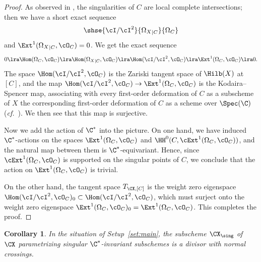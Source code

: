 \documentclass[11pt]{amsart}
\numberwithin{equation}{section}
\newtheorem{corollary}[theorem]{Corollary}
\theoremstyle{definition}
\theoremstyle{remark}
\begin{document}
\begin{proof}
As observed in \cite[Proof of Proposition 6.4]{WORS6}, the singularities of $C$ are local complete intersections; then we have a short exact sequence
\begin{equation}\label{eq:ses1}
\shse{\cI/\cI^2}{{\Omega_X}_{|C}}{\Omega_C}
\end{equation}
and  $\Ext^1({\Omega_X}_{|C},\cO_C)=0$. 
We get the exact sequence 
\begin{multline}\label{eq:FP}
0\lra\Hom(\Omega_C,\cO_C)\lra\Hom({\Omega_X}_{|C},\cO_C)\lra \Hom(\cI/\cI^2,\cO_C)\lra \Ext^1(\Omega_C,\cO_C)\lra 0.
\end{multline}
The space $\Hom(\cI/\cI^2,\cO_C)$ is the Zariski tangent space of $\Hilb(X)$ at $[C]$, and the map $\Hom(\cI/\cI^2,\cO_C)\to \Ext^1(\Omega_C,\cO_C)$ is the Kodaira--Spencer map, associating  with every first-order deformation of $C$ as a subscheme of $X$ the corresponding first-order deformation of $C$ as a scheme over $\Spec(\C)$ (\textit{cf.}~\cite[Remark 2.4.4]{Ser1}). We then see that this map is surjective. 

Now we add the action of $\C^*$ into the picture. On one hand, we have induced $\C^*$-actions on the  spaces $\Ext^1(\Omega_C,\cO_C)$ and $\HH^0(C,\cExt^1(\Omega_C,\cO_C))$, and the natural map between them is $\C^*$-equivariant. Hence, since $\cExt^1(\Omega_C,\cO_C)$ is supported on the singular points of $C$, we conclude that the action on $\Ext^1(\Omega_C,\cO_C)$ is trivial.

 On the other hand, the tangent space $T_{\CX,[C]}$ is the weight zero eigenspace  $\Hom(\cI/\cI^2,\cO_C)_0\subset \Hom(\cI/\cI^2,\cO_C)$, which must surject onto the weight zero eigenspace $\Ext^1(\Omega_C,\cO_C)_0=\Ext^1(\Omega_C,\cO_C)$. This completes the proof.
\end{proof}

\begin{corollary}\label{cor:kodspen}
In the situation of Setup~\ref{set:main}, the subscheme $\CX_{\sing}$ of\, $\CX$ parametrizing singular $\C^*$-invariant subschemes is a divisor with normal crossings.
\end{corollary}
\end{document}
